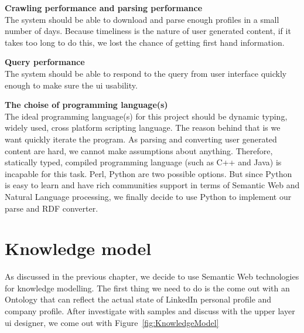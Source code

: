 \begin{description}
	\item \textbf{Crawling performance and parsing performance} \hfill \\
	The system should be able to download and parse enough profiles in a small number of days. Because timeliness is the nature of user generated content, if it takes too long to do this, we lost the chance of getting first hand information.
	\item \textbf{Query performance} \hfill \\
	The system should be able to respond to the query from user interface quickly enough to make sure the \gls{ui} usability.
	\item \textbf{The choise of programming language(s)} \hfill \\
	The ideal programming language(s) for this project should be dynamic typing, widely used, cross platform scripting language. The reason behind that is we want quickly iterate the program. As parsing and converting user generated content are hard, we cannot make assumptions about anything. Therefore, statically typed, compiled programming language (such as C++ and Java) is incapable for this task. Perl, Python are two possible options. But since Python is easy to learn and have rich communities support in terms of Semantic Web and Natural Language processing, we finally decide to use Python to implement our parse and RDF converter.
\end{description}


\section{Knowledge model}

As discussed in the previous chapter, we decide to use Semantic Web technologies for knowledge modelling. The first thing we need to do is the come out with an Ontology that can reflect the actual state of LinkedIn personal profile and company profile. After investigate with samples and discuss with the upper layer \acrshort{ui} designer, we come out with Figure~\ref{fig:KnowledgeModel}

